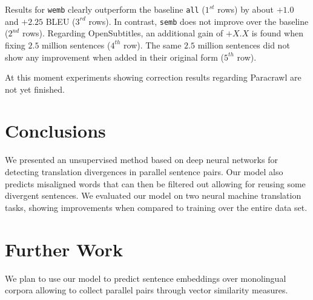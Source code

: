 \documentclass[11pt,a4paper]{article}
\begin{document}
Results for \texttt{wemb} clearly outperform the baseline \texttt{all} ($1^{st}$ rows) by about $+1.0$ and $+2.25$ BLEU ($3^{rd}$ rows). 
In contrast, \texttt{semb} does not improve over the baseline ($2^{nd}$ rows).
Regarding OpenSubtitles, an additional gain of $+X.X$ is found when fixing $2.5$ million sentences ($4^{th}$ row). 
The same $2.5$ million sentences did not show any improvement when added in their original form ($5^{th}$ row).

At this moment experiments showing correction results regarding Paracrawl  are not yet finished.

\section{Conclusions}
\label{conclusions}

We presented an unsupervised method based on deep neural networks for detecting translation divergences in parallel sentence pairs. 
Our model also predicts misaligned words that can then be filtered out allowing for reusing some divergent sentences.
We evaluated our model on two neural machine translation tasks, showing improvements when compared to training over the entire data set. 

\section{Further Work}
\label{further}

We plan to use our model to predict sentence embeddings over monolingual corpora allowing to collect parallel pairs through vector similarity measures.




\end{document}
